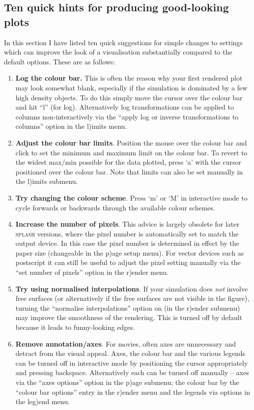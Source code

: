 \documentclass[a4paper,10pt]{article}
\newcommand{\splash}{\textsc{splash }}
\begin{document}
\subsection{Ten quick hints for producing good-looking plots}
In this section I have listed ten quick suggestions for simple changes to settings which can improve the look of a visualisation substantially compared to the default options. These are as follows:
\begin{enumerate}
\item {\bf Log the colour bar.} This is often the reason why your first rendered plot may look somewhat blank, especially if the simulation is dominated by a few high density objects. To do this simply move the cursor over the colour bar and hit ``l'' (for log). Alternatively log transformations can be applied to columns non-interactively via the ``apply log or inverse transformations to columns'' option in the l)imits menu.
\item {\bf Adjust the colour bar limits}. Position the mouse over the colour bar and click to set the minimum and maximum limit on the colour bar. To revert to the widest max/min possible for the data plotted, press `a' with the cursor positioned over the colour bar. Note that limits can also be set manually in the l)imits submenu.
\item {\bf Try changing the colour scheme}. Press `m' or `M' in interactive mode to cycle forwards or backwards through the available colour schemes.
\item {\bf Increase the number of pixels}. This advice is largely obsolete for later \splash versions, where the pixel number is automatically set to match the output device. In this case the pixel number is determined in effect by the paper size (changeable in the p)age setup menu). For vector devices such as postscript it can still be useful to adjust the pixel setting manually via the ``set number of pixels'' option in the r)ender menu.
\item {\bf Try using normalised interpolations}. If your simulation does \emph{not} involve free surfaces (or alternatively if the free surfaces are not visible in the figure), turning the ``normalise interpolations'' option on (in the r)ender submenu) may improve the smoothness of the rendering. This is turned off by default because it leads to funny-looking edges.
\item {\bf Remove annotation/axes}. For movies, often axes are unnecessary and detract from the visual appeal. Axes, the colour bar and the various legends can be turned off in interactive mode by positioning the cursor appropriately and pressing backspace. Alternatively each can be turned off manually -- axes via the ``axes options'' option in the p)age submenu; the colour bar by the ``colour bar options'' entry in the r)ender menu and the legends via options in the leg)end menu.

\end{enumerate}
\end{document}
